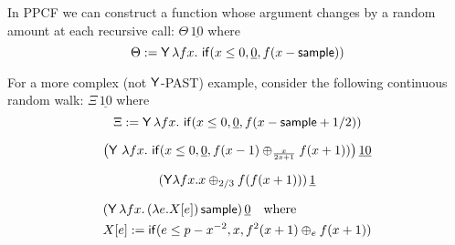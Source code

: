 \iffalse
Sampling from continuous distributions is an essential feature of statistical probabilistic programming languages. (See e.g.~Church \cite{DBLP:conf/uai/GoodmanMRBT08}, Stan \cite{carpenter2017stan}, Anglican \cite{DBLP:conf/pkdd/TolpinMW15}, Gen \cite{cusumano-towner2019Gen}, Pyro \cite{bingham2019Pyro}, Edward \cite{tran2016edward} and Turing \cite{ge2018Turing}.)
Methods of proving AST of probabilistic computation have been developed for probabilistic programs with discrete distributions (see e.g.~\cite{DBLP:journals/toplas/LagoG19,DBLP:journals/jacm/KaminskiKMO18,DBLP:conf/lics/OlmedoKKM16,DBLP:conf/lics/KobayashiLG19,DBLP:conf/mfcs/KaminskiK15,DBLP:series/mcs/McIverM05}).
To our knowledge, the problem of proving AST of probabilistic functional programs with continuous distribution is new.
\fi

\begin{example}\label{ex:raven complex}
In PPCF we can construct a function whose argument changes by a random amount at each recursive call: $\Theta \, \underline{10}$ where
\[
\Theta := \mathsf{Y} \, \lambda f x .\ \mathsf{if}(x \leq 0, \underline 0, f(x - \mathsf{sample}))
\]

For a more complex (not $\mathsf{Y}$-PAST) example, consider the following continuous random walk: $\Xi \, \underline{10}$ where
\[
\Xi := \mathsf{Y} \, \lambda f x .\ \mathsf{if}(x \leq 0, \underline 0, f(x - \mathsf{sample} + 1/2)) 
\]
\end{example}

\begin{example}
\label{ex:Fair-in-the-limit random walk}\cite[\S 5.3]{DBLP:journals/pacmpl/McIverMKK18}
\[
\big
(\tY\ \lambda f x .\ 
\tif{x \leq 0}{\underline 0}{f(x - 1) \oplus_{\frac{x}{2x+1}} f(x + 1)} \big)
\, \underline{10}
\]
\end{example}

\begin{example}
\label{ex:non-affine recursion easy}
\[
(\mathsf{Y} \lambda f x. x \oplus_{2/3} f (f (x + 1)))\, \underline 1
\]
\end{example}

\begin{example}
\label{ex:non-affine continuous}
\begin{align*}
& (\mathsf{Y}\, \lambda f x.\, (\lambda e. X[e]) \, \mathsf{sample})\, \underline 0 \quad \hbox{where}\\
& X[e] := \mathsf{if}(e \leq p - x^{-2}, x, f^2(x+1) \oplus_e f(x+1))
\end{align*}
\end{example}

